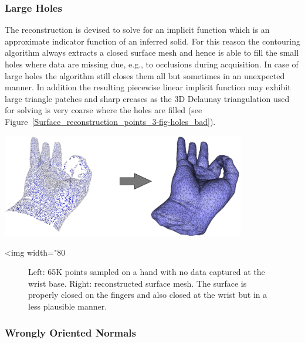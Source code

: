 \subsubsection{Large Holes}

The reconstruction is devised to solve for an implicit function which is an approximate indicator function of an inferred solid. For this reason the contouring algorithm always extracts a closed surface mesh and hence is able to fill the small holes where data are missing due, e.g., to occlusions during acquisition. In case of large holes the algorithm still closes them all but sometimes in an unexpected manner. In addition the resulting piecewise linear implicit function may exhibit large triangle patches and sharp creases as the 3D Delaunay triangulation used for solving is very coarse where the holes are filled (see Figure~\ref{Surface_reconstruction_points_3-fig-holes_bad}).

\begin{center}
    \label{Surface_reconstruction_points_3-fig-holes_bad}
    \begin{ccTexOnly}
\includegraphics[width=0.8\textwidth]{Surface_reconstruction_points_3/holes_bad}
    \end{ccTexOnly}
    \begin{ccHtmlOnly}
        <img width="80%
    \end{ccHtmlOnly}
    \begin{figure}[h]
        \caption{Left: 65K points sampled on a hand with no data
                 captured at the wrist base.
                 Right: reconstructed surface mesh. The surface is
                 properly closed on the fingers and also closed
                 at the wrist but in a less plausible manner.}
    \end{figure}
\end{center}


\subsubsection{Wrongly Oriented Normals}

